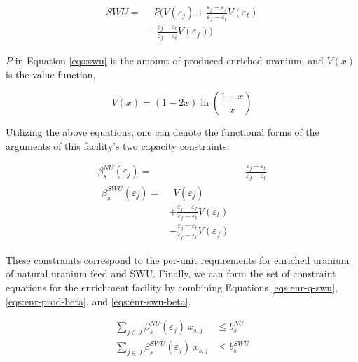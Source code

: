 \begin{align}
\begin{split}
\label{eqs:swu}
SWU = & \:\: P ( V(\varepsilon_{j}) 
      + \frac{\varepsilon_{j} - \varepsilon_{f}}
               {\varepsilon_{f} - \varepsilon_{t}} V(\varepsilon_{t}) \\
      & - \frac{\varepsilon_{j} - \varepsilon_{t}}
               {\varepsilon_{f} - \varepsilon_{t}} V(\varepsilon_{f}) )
\end{split}
\end{align}

$P$ in Equation \ref{eqs:swu} is the amount of produced enriched uranium, and
$V(x)$ is the value function,

\begin{equation}\label{eqs:value}
  V(x) = (1-2x) \ln \left(\frac{1-x}{x}\right)
\end{equation}

Utilizing the above equations, one can denote the functional forms of the
arguments of this facility's two capacity constraints.

\begin{align}
\label{eqs:enr-prod-beta}
\beta_{s}^{NU}(\varepsilon_{j}) = & \:\: \frac{\varepsilon_{j} - \varepsilon_{t}}
                                      {\varepsilon_{f} - \varepsilon_{t}} \\
\begin{split}
\label{eqs:enr-swu-beta}
\beta_{s}^{SWU}(\varepsilon_{j}) = & \:\: V(\varepsilon_{j}) \\
                         & + \frac{\varepsilon_{j} - \varepsilon_{f}}
                                  {\varepsilon_{f} - \varepsilon_{t}} V(\varepsilon_{t}) \\
                         & - \frac{\varepsilon_{j} - \varepsilon_{t}}
                                  {\varepsilon_{f} - \varepsilon_{t}} V(\varepsilon_{f})
\end{split}
\end{align}

These constraints correspond to the per-unit requirements for enriched uranium
of natural uranium feed and SWU. Finally, we can form the set of constraint
equations for the enrichment facility by combining Equations
\ref{eqs:enr-q-swu}, \ref{eqs:enr-prod-beta}, and \ref{eqs:enr-swu-beta}.

\begin{align}
\label{eqs:enr-prod-constr}
\sum_{j \in J}\beta_{s}^{NU}(\varepsilon_{j}) \: x_{s,j}  & \leq b_{s}^{NU} \\
\label{eqs:enr-swu-constr}
\sum_{j \in J}\beta_{s}^{SWU}(\varepsilon_{j}) \: x_{s,j} & \leq b_{s}^{SWU}
\end{align}

